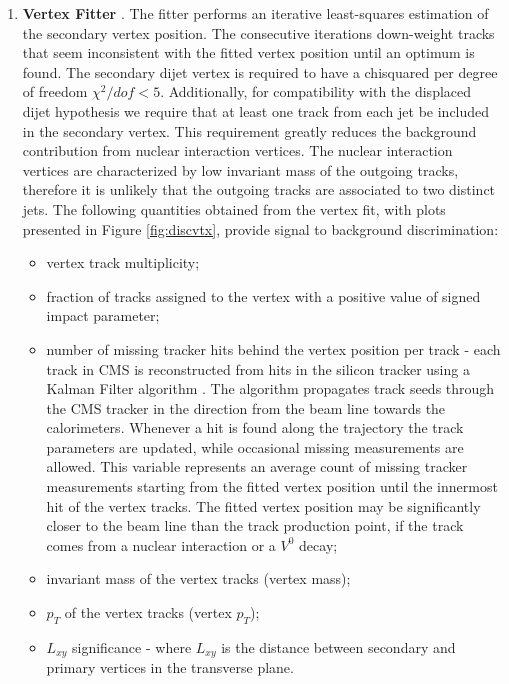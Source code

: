 \begin{enumerate}

\item{\bf Vertex Fitter}
\label{subsec:AVF}
\cite{Waltenberger:1166320}. The fitter performs an iterative least-squares estimation of the
 secondary vertex position. The consecutive iterations down-weight tracks that seem inconsistent
with the fitted vertex position until an optimum is found.
 The secondary dijet vertex is required to have a chisquared per degree of freedom 
$\chi^2/dof < 5$. Additionally, for compatibility with the displaced dijet hypothesis we require that at least 
one track from each jet be included in the secondary vertex. 
This requirement greatly reduces the background contribution
from nuclear interaction vertices. The nuclear interaction vertices are characterized by low invariant mass
of the outgoing tracks, therefore it is unlikely that the outgoing tracks are associated to two distinct jets. 
The following quantities obtained from the vertex fit, with plots presented in Figure
\ref{fig:discvtx}, provide signal to background discrimination:
\begin{itemize}
 \item vertex track multiplicity;
 \item fraction of tracks assigned to the vertex with a positive value of signed impact parameter;
 \item number of missing tracker hits behind the vertex position per track - each track in CMS is reconstructed 
from hits in the silicon tracker using a Kalman Filter algorithm \cite{Giordano:2012hr}. The algorithm propagates
 track seeds through the CMS tracker in the direction from the beam line towards the calorimeters. Whenever a hit 
is found along the trajectory the track parameters are updated, while occasional missing measurements 
are allowed. 
This variable represents an average count of missing tracker measurements 
starting from the fitted vertex position until the innermost hit of the vertex tracks. The fitted vertex position
may be significantly closer to the beam line than the track production point, if the track comes from a nuclear
 interaction or a $V^0$ decay;
 \item invariant mass of the vertex tracks (vertex mass);
 \item $p_T$ of the vertex tracks (vertex $p_T$);
 \item $L_{xy}$ significance - where $L_{xy}$ is the distance between secondary and primary vertices
in the transverse plane.
\end{itemize}



\end{enumerate}
